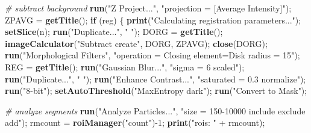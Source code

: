 \documentclass[11pt,singlespacinge,twoside]{reedthesis} %
\newenvironment{Shaded}{}{}
\newcommand{\CommentTok}[1]{\textit{#1}}
\newcommand{\ControlFlowTok}[1]{\textbf{#1}}
\newcommand{\DecValTok}[1]{#1}
\newcommand{\KeywordTok}[1]{\textbf{#1}}
\newcommand{\NormalTok}[1]{#1}
\newcommand{\OperatorTok}[1]{#1}
\newcommand{\StringTok}[1]{#1}
\theoremstyle{definition}
\theoremstyle{definition}
\theoremstyle{definition}
\theoremstyle{remark}
\begin{document}
\scriptsize
\begin{Shaded}
\begin{Highlighting}[numbers=left,,]
\CommentTok{#   subtract background}
        \KeywordTok{run}\NormalTok{(}\StringTok{"Z Project..."}\NormalTok{, }\StringTok{"projection = [Average Intensity]"}\NormalTok{);}
\NormalTok{        ZPAVG =}\StringTok{ }\KeywordTok{getTitle}\NormalTok{();}
        \ControlFlowTok{if}\NormalTok{ (reg) \{}
            \KeywordTok{print}\NormalTok{(}\StringTok{"Calculating registration parameters..."}\NormalTok{);}
            \KeywordTok{setSlice}\NormalTok{(n);}
            \KeywordTok{run}\NormalTok{(}\StringTok{"Duplicate..."}\NormalTok{, }\StringTok{" "}\NormalTok{); }
\NormalTok{            DORG =}\StringTok{ }\KeywordTok{getTitle}\NormalTok{();}
            \KeywordTok{imageCalculator}\NormalTok{(}\StringTok{"Subtract create"}\NormalTok{, DORG, ZPAVG);}
            \KeywordTok{close}\NormalTok{(DORG);}
            \KeywordTok{run}\NormalTok{(}\StringTok{"Morphological Filters"}\NormalTok{,}
                \StringTok{"operation = Closing element=Disk radius = 15"}\NormalTok{);}
\NormalTok{            REG =}\StringTok{ }\KeywordTok{getTitle}\NormalTok{();}
            \KeywordTok{run}\NormalTok{(}\StringTok{"Gaussian Blur..."}\NormalTok{, }\StringTok{"sigma = 6 scaled"}\NormalTok{); }
            \KeywordTok{run}\NormalTok{(}\StringTok{"Duplicate..."}\NormalTok{, }\StringTok{" "}\NormalTok{);}
            \KeywordTok{run}\NormalTok{(}\StringTok{"Enhance Contrast..."}\NormalTok{, }\StringTok{"saturated = 0.3 normalize"}\NormalTok{);}
            \KeywordTok{run}\NormalTok{(}\StringTok{"8-bit"}\NormalTok{);}
            \KeywordTok{setAutoThreshold}\NormalTok{(}\StringTok{"MaxEntropy  dark"}\NormalTok{);}
            \KeywordTok{run}\NormalTok{(}\StringTok{"Convert to Mask"}\NormalTok{);}

    \CommentTok{# analyze segments}
        \KeywordTok{run}\NormalTok{(}\StringTok{"Analyze Particles..."}\NormalTok{, }\StringTok{"size = 150-10000 include exclude add"}\NormalTok{);}
\NormalTok{        rmcount =}\StringTok{ }\KeywordTok{roiManager}\NormalTok{(}\StringTok{"count"}\NormalTok{)}\OperatorTok{-}\DecValTok{1}\NormalTok{;}
        \KeywordTok{print}\NormalTok{(}\StringTok{"rois: "} \OperatorTok{+}\StringTok{ }\NormalTok{rmcount);}
        

\end{Highlighting}
\end{Shaded}
\end{document}
